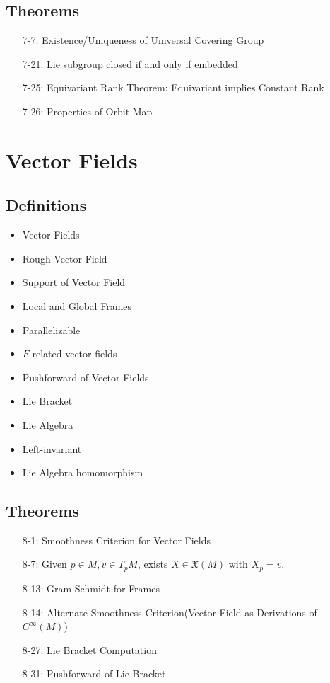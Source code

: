\documentclass[11.5pt]{scrartcl}
\newcommand{\<}{\langle}
\renewcommand{\>}{\rangle}
\begin{document}
\subsection{Theorems}
\begin{itemize}
\item[7-7:] Existence/Uniqueness of Universal Covering Group
\item[7-21:] Lie subgroup closed if and only if embedded
\item[7-25:] Equivariant Rank Theorem: Equivariant implies Constant Rank
\item[7-26:] Properties of Orbit Map
\end{itemize}

\section{Vector Fields}
\subsection{Definitions}
\begin{itemize}
\item Vector Fields
\item Rough Vector Field
\item Support of Vector Field
\item Local and Global Frames
\item Parallelizable
\item $F$-related vector fields
\item Pushforward of Vector Fields
\item Lie Bracket
\item Lie Algebra
\item Left-invariant
\item Lie Algebra homomorphism
\end{itemize}
\subsection{Theorems}
\begin{itemize}
\item[8-1:] Smoothness Criterion for Vector Fields
\item[8-7:] Given $p\in M, v \in T_pM$, exists $X \in \mathfrak{X}(M)$ with $X_p = v$.
\item[8-13:] Gram-Schmidt for Frames
\item[8-14:] Alternate Smoothness Criterion(Vector Field as Derivations of $C^\infty(M)$)
\item[8-27:] Lie Bracket Computation
\item[8-31:] Pushforward of Lie Bracket
\end{itemize}
\end{document}
